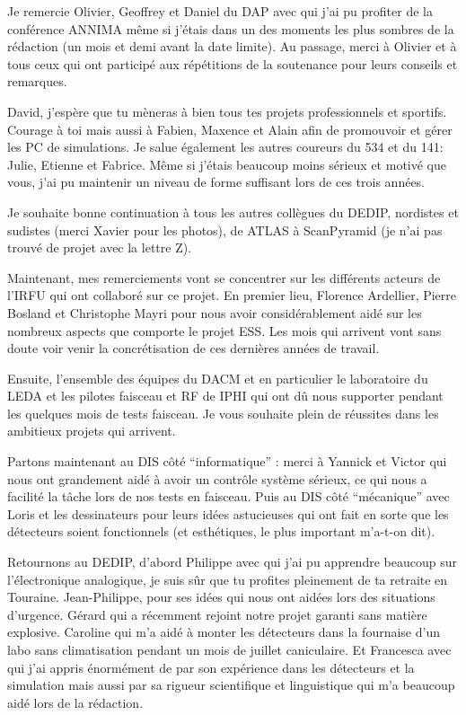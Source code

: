 Je remercie Olivier, Geoffrey et Daniel du DAP avec qui j’ai pu profiter de la conférence ANNIMA même si j’étais dans un des moments les plus sombres de la rédaction (un mois et demi avant la date limite). Au passage, merci à Olivier et à tous ceux qui ont participé aux répétitions de la soutenance pour leurs conseils et remarques.

David, j’espère que tu mèneras à bien tous tes projets professionnels et sportifs. Courage à toi mais aussi à Fabien, Maxence et Alain afin de promouvoir et gérer les PC de simulations. Je salue également les autres coureurs du 534 et du 141: Julie, Etienne et Fabrice. Même si j’étais beaucoup moins sérieux et motivé que vous, j’ai pu maintenir un niveau de forme suffisant lors de ces trois années.

Je souhaite bonne continuation à tous les autres collègues du DEDIP, nordistes et sudistes (merci Xavier pour les photos), de ATLAS à ScanPyramid (je n’ai pas trouvé de projet avec la lettre Z).

Maintenant, mes remerciements vont se concentrer sur les différents acteurs de l’IRFU qui ont collaboré sur ce projet. En premier lieu, Florence Ardellier, Pierre Bosland et Christophe Mayri pour nous avoir considérablement aidé sur les nombreux aspects que comporte le projet ESS. Les mois qui arrivent vont sans doute voir venir la concrétisation de ces dernières années de travail.

Ensuite, l'ensemble des équipes du DACM et en particulier le laboratoire du LEDA et les pilotes faisceau et RF de IPHI qui ont dû nous supporter pendant les quelques mois de tests faisceau. Je vous souhaite plein de réussites dans les ambitieux projets qui arrivent.

Partons maintenant au DIS côté “informatique” : merci à Yannick et Victor qui nous ont grandement aidé à avoir un contrôle système sérieux, ce qui nous a facilité la tâche lors de nos tests en faisceau. Puis au DIS côté “mécanique” avec Loris et les dessinateurs pour leurs idées astucieuses qui ont fait en sorte que les détecteurs soient fonctionnels (et esthétiques, le plus important m’a-t-on dit).

Retournons au DEDIP, d’abord Philippe avec qui j’ai pu apprendre beaucoup sur l'électronique analogique, je suis sûr que tu profites pleinement de ta retraite en Touraine. Jean-Philippe, pour ses idées qui nous ont aidées lors des situations d’urgence. Gérard qui a récemment rejoint notre projet garanti sans matière explosive. Caroline qui m’a aidé à monter les détecteurs dans la fournaise d’un labo sans climatisation pendant un mois de juillet caniculaire. Et Francesca avec qui j'ai appris énormément de par son expérience dans les détecteurs et la simulation mais aussi par sa rigueur scientifique et linguistique qui m’a beaucoup aidé lors de la rédaction.

